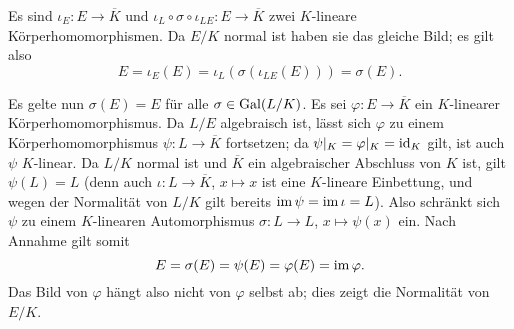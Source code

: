 \begin{solution}
\begin{itemize}
      Es sind $\iota_E \colon E \to \overline{K}$ und $\iota_L \circ \sigma \circ \iota_{LE} \colon E \to \overline{K}$ zwei $K$-lineare Körperhomomorphismen.
      Da $E/K$ normal ist haben sie das gleiche Bild; es gilt also
      \[
          E
        = \iota_E(E)
        = \iota_L(\sigma(\iota_{LE}(E)))
        = \sigma(E).
      \]
      
      Es gelte nun $\sigma(E) = E$ für alle $\sigma \in \operatorname{Gal}(L/K)$.
      Es sei $\varphi \colon E \to \overline{K}$ ein $K$-linearer Körperhomomorphismus.
      Da $L/E$ algebraisch ist, lässt sich $\varphi$ zu einem Körperhomomorphismus $\psi \colon L \to \overline{K}$ fortsetzen;
      da $\psi|_K = \varphi|_K = \operatorname{id}_K$ gilt, ist auch $\psi$ $K$-linear.
      Da $L/K$ normal ist und $\overline{K}$ ein algebraischer Abschluss von $K$ ist, gilt $\psi(L) = L$ (denn auch $\iota \colon L \to \overline{K}$, $x \mapsto x$ ist eine $K$-lineare Einbettung, und wegen der Normalität von $L/K$ gilt bereits $\operatorname{im} \psi = \operatorname{im} \iota = L$).
      Also schränkt sich $\psi$ zu einem $K$-linearen Automorphismus $\sigma \colon L \to L$, $x \mapsto \psi(x)$ ein.
      Nach Annahme gilt somit
      \[
          E
        = \sigma(E)
        = \psi(E)
        = \varphi(E)
        = \operatorname{im} \varphi.
      \]
      Das Bild von $\varphi$ hängt also nicht von $\varphi$ selbst ab;
      dies zeigt die Normalität von $E/K$.
  \end{itemize}
\end{solution}


